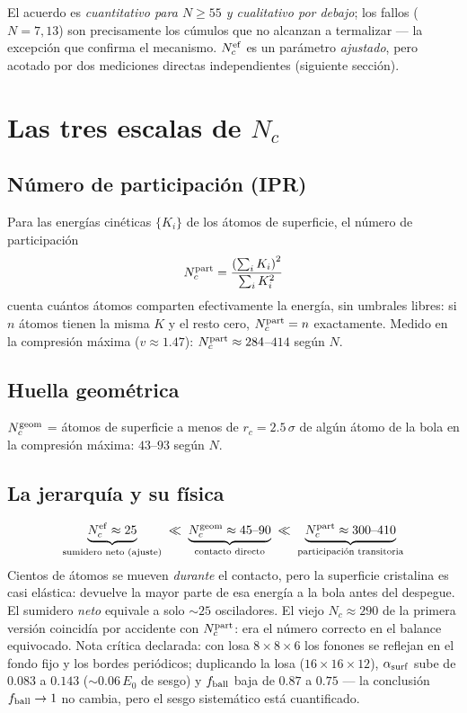 \documentclass[11pt,a4paper]{article}
\begin{document}
El acuerdo es \emph{cuantitativo para $N\ge55$ y cualitativo por debajo};
los fallos ($N=7,13$) son precisamente los cúmulos que no alcanzan a
termalizar --- la excepción que confirma el mecanismo. $N_c^{\rm ef}$ es un
parámetro \emph{ajustado}, pero acotado por dos mediciones directas
independientes (siguiente sección).

\section{Las tres escalas de $N_c$}
\label{sec:tresescalas}

\subsection{Número de participación (IPR)}
Para las energías cinéticas $\{K_i\}$ de los átomos de superficie, el
número de participación
\begin{equation}
N_c^{\rm part} = \frac{\left(\sum_i K_i\right)^2}{\sum_i K_i^2}
\end{equation}
cuenta cuántos átomos comparten efectivamente la energía, sin umbrales
libres: si $n$ átomos tienen la misma $K$ y el resto cero,
$N_c^{\rm part} = n$ exactamente. Medido en la compresión máxima
($v\approx1.47$): $N_c^{\rm part} \approx 284$--$414$ según $N$.

\subsection{Huella geométrica}
$N_c^{\rm geom}$ = átomos de superficie a menos de $r_c=2.5\,\sigma$ de
algún átomo de la bola en la compresión máxima: $43$--$93$ según $N$.

\subsection{La jerarquía y su física}
\begin{equation}
\underbrace{N_c^{\rm ef}\approx25}_{\text{sumidero neto (ajuste)}}
\;\ll\;
\underbrace{N_c^{\rm geom}\approx45\text{--}90}_{\text{contacto directo}}
\;\ll\;
\underbrace{N_c^{\rm part}\approx300\text{--}410}_{\text{participación
transitoria}}
\end{equation}
Cientos de átomos se mueven \emph{durante} el contacto, pero la superficie
cristalina es casi elástica: devuelve la mayor parte de esa energía a la
bola antes del despegue. El sumidero \emph{neto} equivale a solo $\sim25$
osciladores. El viejo $N_c\approx290$ de la primera versión coincidía por
accidente con $N_c^{\rm part}$: era el número correcto en el balance
equivocado. Nota crítica declarada: con losa $8\times8\times6$ los fonones
se reflejan en el fondo fijo y los bordes periódicos; duplicando la losa
($16\times16\times12$), $\alpha_{\rm surf}$ sube de $0.083$ a $0.143$
($\sim0.06\,E_0$ de sesgo) y $f_{\rm ball}$ baja de $0.87$ a $0.75$ ---
la conclusión $f_{\rm ball}\to1$ no cambia, pero el sesgo sistemático está
cuantificado.
\end{document}
